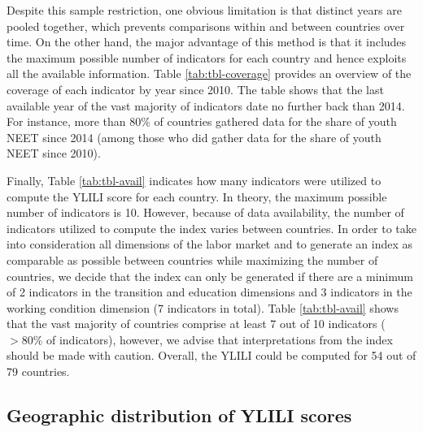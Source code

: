 \documentclass[
  a4paper, twoside, 12pt]{book}
\begin{document}
Despite this sample restriction, one obvious limitation is that distinct years are pooled together, which prevents comparisons within and between countries over time. On the other hand, the major advantage of this method is that it includes the maximum possible number of indicators for each country and hence exploits all the available information. Table \ref{tab:tbl-coverage} provides an overview of the coverage of each indicator by year since 2010. The table shows that the last available year of the vast majority of indicators date no further back than 2014. For instance, more than 80\% of countries gathered data for the share of youth NEET since 2014 (among those who did gather data for the share of youth NEET since 2010).



Finally, Table \ref{tab:tbl-avail} indicates how many indicators were utilized to compute the YLILI score for each country. In theory, the maximum possible number of indicators is 10. However, because of data availability, the number of indicators utilized to compute the index varies between countries. In order to take into consideration all dimensions of the labor market and to generate an index as comparable as possible between countries while maximizing the number of countries, we decide that the index can only be generated if there are a minimum of 2 indicators in the transition and education dimensions and 3 indicators in the working condition dimension (7 indicators in total). Table \ref{tab:tbl-avail} shows that the vast majority of countries comprise at least 7 out of 10 indicators (\(>80\%\) of indicators), however, we advise that interpretations from the index should be made with caution. Overall, the YLILI could be computed for 54 out of 79 countries.

\begin{singlespacing}

\end{singlespacing}

\hypertarget{maps}{%
\subsection*{Geographic distribution of YLILI scores}\label{maps}}

\end{document}
